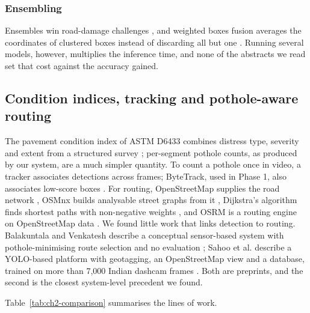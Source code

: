\subsubsection*{Ensembling}
Ensembles win road-damage challenges \cite{arya2020grddc,arya2022crddc}, and weighted boxes fusion averages the coordinates of clustered boxes instead of discarding all but one \cite{solovyev2021wbf}. Running several models, however, multiplies the inference time, and none of the abstracts we read set that cost against the accuracy gained.

\subsection{Condition indices, tracking and pothole-aware routing}
The pavement condition index of ASTM D6433 combines distress type, severity and extent from a structured survey \cite{astm2020d6433}; per-segment pothole counts, as produced by our system, are a much simpler quantity. To count a pothole once in video, a tracker associates detections across frames; ByteTrack, used in Phase 1, also associates low-score boxes \cite{zhang2022bytetrack}. For routing, OpenStreetMap supplies the road network \cite{haklay2008osm}, OSMnx builds analysable street graphs from it \cite{boeing2017osmnx}, Dijkstra's algorithm finds shortest paths with non-negative weights \cite{dijkstra1959note}, and OSRM is a routing engine on OpenStreetMap data \cite{luxen2011osrm}. We found little work that links detection to routing. Balakuntala and Venkatesh describe a conceptual sensor-based system with pothole-minimising route selection and no evaluation \cite{balakuntala2013pothole}; Sahoo et al. describe a YOLO-based platform with geotagging, an OpenStreetMap view and a database, trained on more than 7,000 Indian dashcam frames \cite{sahoo2025iwatchroadv2}. Both are preprints, and the second is the closest system-level precedent we found.

Table~\ref{tab:ch2-comparison} summarises the lines of work.

